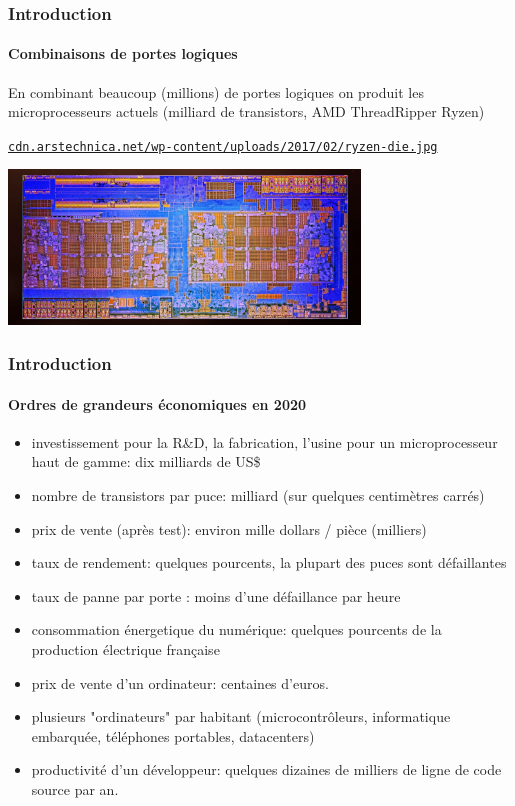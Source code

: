\documentclass[xcolor=svgnames,final,smaller,a4]{beamer}
\begin{document}
\begin{frame}
  \frametitle{Introduction}
  \framesubtitle{Combinaisons de portes logiques}

En combinant beaucoup (millions) de portes logiques on produit les microprocesseurs actuels (milliard de transistors, 
AMD ThreadRipper Ryzen)

\vspace{0.5cm}

 \href{https://cdn.arstechnica.net/wp-content/uploads/2017/02/ryzen-die.jpg}{\texttt{cdn.arstechnica.net/wp-content/uploads/2017/02/ryzen-die.jpg}}

 \vspace{0.5cm}
 \includegraphics[width=0.7\textwidth]{ryzen-die.jpg}

\end{frame}

\begin{frame}
  \frametitle{Introduction}
  \framesubtitle{Ordres de grandeurs économiques en 2020}

\begin{itemize}
\item investissement pour la R\&D, la fabrication, l'usine pour un microprocesseur haut de gamme: dix milliards de US\$
\item nombre de transistors par puce: milliard (sur quelques centimètres carrés)
\item prix de vente (après test): environ mille dollars / pièce (milliers)
\item taux de rendement: quelques pourcents, la plupart des puces sont défaillantes
\item taux de panne par porte : moins d'une défaillance par heure
\item consommation énergetique du numérique: quelques pourcents de la production électrique française
\item prix de vente d'un ordinateur: centaines d'euros.
\item plusieurs "ordinateurs" par habitant (microcontrôleurs, informatique embarquée, téléphones portables, datacenters)
  \item productivité d'un développeur: quelques dizaines de milliers de ligne de code source par an.
\end{itemize}
\end{frame}
\end{document}
